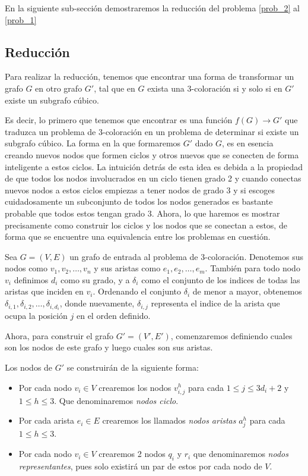 \documentclass{article}
\begin{document}
En la siguiente sub-sección demostraremos la reducción del problema \ref{prob_2} al \ref{prob_1}

\subsection{Reducción}

Para realizar la reducción, tenemos que encontrar una forma de transformar un grafo $G$ en otro grafo $G'$, tal que
en $G$ exista una 3-coloración si y solo si en $G'$ existe un subgrafo cúbico.

Es decir, lo primero que tenemos que encontrar es una función $f(G) \to G'$ que traduzca un problema de 3-coloración en un
problema de determinar si existe un subgrafo cúbico. La forma en la que formaremos $G'$ dado $G$, es en esencia creando nuevos nodos
que formen ciclos y otros nuevos que se conecten de forma inteligente a estos ciclos. La intuición detrás de esta idea es debida
a la propiedad de que todos los nodos involucrados en un ciclo tienen grado 2 y cuando conectas nuevos nodos a estos ciclos
empiezas a tener nodos de grado 3 y si escoges cuidadosamente un subconjunto de todos los nodos generados es bastante probable que todos
estos tengan grado 3. Ahora, lo que haremos es mostrar precisamente como construir los ciclos y los nodos que se conectan a estos, de forma
que se encuentre una equivalencia entre los problemas en cuestión.


Sea $G = (V, E)$ un grafo de entrada al problema de 3-coloración. Denotemos sus nodos como
$v_1,v_2,\dots,v_n$ y sus aristas como $e_1,e_2,\dots,e_m$. También para todo nodo $v_i$ definimos
$d_i$ como su grado, y a $\delta_i$ como el conjunto de los indices de todas las aristas que inciden en $v_i$.
Ordenando el conjunto $\delta_i$ de menor a mayor, obtenemos $\delta_{i,1}, \delta_{i,2},\dots,\delta_{i,d_i}$,
donde nuevamente, $\delta_{i,j}$ representa el indice de la arista que ocupa la posición $j$ en el orden definido.

Ahora, para construir el grafo $G' = (V', E')$, comenzaremos definiendo cuales
son los nodos de este grafo y luego cuales son sus aristas.

Los nodos de $G'$ se construirán de la siguiente forma:
\begin{itemize}
    \item Por cada nodo $v_i\in V$ crearemos los nodos $v_{i,j}^h$ para cada $1\leq j \leq 3d_i + 2$ y $1\leq h\leq 3$. Que denominaremos \textit{nodos ciclo}.
    \item Por cada arista $e_i\in E$ crearemos los llamados \textit{nodos aristas} $a_j^h$ para cada $1\leq h \leq 3$.
    \item Por cada nodo $v_i\in V$ crearemos 2 nodos $q_i$ y $r_i$ que denominaremos \textit{nodos representantes}, pues solo existirá un par de estos por cada nodo de $V$.
\end{itemize}
\end{document}
